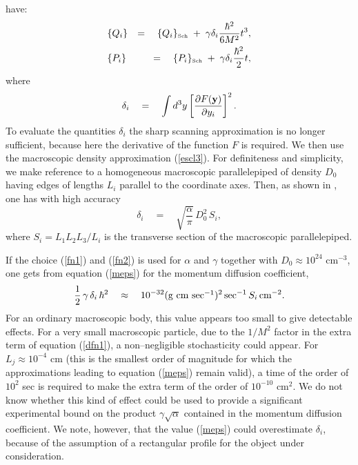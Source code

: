 \documentclass[10pt,a4paper]{article}
\begin{document}
have:
\begin{eqnarray}
& \displaystyle\{ Q_i \} & = \quad \{ Q_i \}_{\makebox{\tiny Sch}}
\; + \; \gamma \delta_i \frac{\hbar^2}{6M^2} t^3,
\label{dfn1} \\
& \displaystyle\{ P_i \} & = \quad \{ P_i \}_{\makebox{\tiny Sch}}
\; + \; \gamma \delta_i \frac{\hbar^2}{2} t, \label{dfn3}
\end{eqnarray}
where
\begin{equation}
\delta_i \quad = \quad \int d^3 y \left[ \frac{\partial F ({\bf
y})}{\partial y_i} \right]^2.
\end{equation}
To evaluate the quantities $\delta_i$ the sharp scanning
approximation is no longer sufficient, because here the derivative
of the function $F$ is required. We then use the macroscopic
density approximation (\ref{escl3}). For definiteness and
simplicity, we make reference to a homogeneous macroscopic
parallelepiped of density $D_0$ having edges of lengths $L_i$
parallel to the coordinate axes. Then, as shown in \cite{csl}, one
has with high accuracy
\begin{equation} \label{meps}
\delta_i \quad = \quad \sqrt{\frac{\alpha}{\pi}}\, D_0^2\, S_i,
\end{equation}
where $S_i = L_1 L_2 L_3 / L_i$ is the transverse section of the
macroscopic parallelepiped.

If the choice (\ref{fn1}) and (\ref{fn2}) is used for $\alpha$ and
$\gamma$ together with $D_0 \approx 10^{24}$ cm$^{-3}$, one gets
from equation (\ref{meps}) for the momentum diffusion coefficient,
\begin{equation}
\frac{1}{2}\, \gamma\, \delta_i \, \hbar^2 \quad \approx \quad
10^{-32} (\makebox{g cm  sec$^{-1}$})^{2}\, \makebox{sec}^{-1}\,
S_i\, \makebox{cm}^{-2} .
\end{equation}
For an ordinary macroscopic body, this value appears too small to
give detectable effects. For a very small macroscopic particle,
due to the $1 / M^2$ factor in the extra term of equation
(\ref{dfn1}), a non--negligible stochasticity could appear. For
$L_j \approx 10^{-4}$ cm (this is the smallest order of magnitude
for which the approximations leading to equation (\ref{meps})
remain valid), a time of the order of $10^2$ sec is required to
make the extra term of the order of $10^{-10}$ cm$^2$. We do not
know whether this kind of effect could be used to provide a
significant experimental bound on the product $\gamma
\sqrt{\alpha}$ contained in the momentum diffusion coefficient. We
note, however, that the value (\ref{meps}) could overestimate
$\delta_i$, because of the assumption of a rectangular profile for
the object under consideration.
\end{document}
